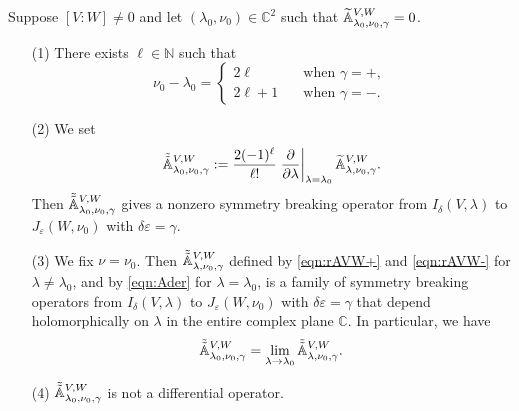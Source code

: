 \begin{theorem}
\label{thm:170340}
Suppose $[V:W]\ne 0$
 and let $({\lambda_0}, {\nu_0}) \in {\mathbb{C}}^2$
 such that ${\widetilde{\mathbb{A}}}_{{\lambda_0},{\nu_0},{\gamma}}^{{V,W}}=0$.  
\begin{enumerate}
\item[{\rm{(1)}}]
There exists $\ell \in {\mathbb{N}}$
 such that
\[
 \nu_0 - \lambda_0 =
 \begin{cases}
 2\ell \quad &\text{when $\gamma =+$, }
\\
 2\ell+1 \quad &\text{when $\gamma =-$. }
 \end{cases}
\]
\item[{\rm{(2)}}]
We set 
\begin{equation}
\label{eqn:Ader}
  \tilde{\tilde{{\mathbb{A}}}}_{{\lambda_0},{\nu_0},{\gamma}}^{{V,W}}
  :=
  \frac{2(-1)^\ell}{\ell!}
  \left. \frac{\partial}{\partial \lambda}\right|_{\lambda=\lambda_0}
  {\widetilde{\mathbb{A}}}_{{\lambda},{\nu_0},{\gamma}}^{{V,W}}.  
\end{equation}
Then $\tilde{\tilde{{\mathbb{A}}}}_{{\lambda_0},{\nu_0},{\gamma}}^{{V,W}}$
 gives a nonzero symmetry breaking operator from
 $I_{\delta}(V,\lambda)$ to $J_{\varepsilon}(W,\nu_0)$
 with $\delta \varepsilon = \gamma$.  
\item[{\rm{(3)}}]
We fix $\nu=\nu_0$.  
Then $\tilde{\tilde{{\mathbb{A}}}}_{{\lambda},{\nu_0},{\gamma}}^{{V,W}}$ defined
 by \eqref{eqn:rAVW+} and \eqref{eqn:rAVW-}
 for $\lambda \ne \lambda_0$, 
 and by \eqref{eqn:Ader} for $\lambda = \lambda_0$, 
 is a family of symmetry breaking operators from 
 $I_{\delta}(V,\lambda)$ to $J_{\varepsilon}(W,\nu_0)$
 with $\delta \varepsilon =\gamma$ 
 that depend holomorphically
 on $\lambda$ 
 in the entire complex plane ${\mathbb{C}}$.  
In particular,
 we have 
\begin{equation}
\label{eqn:rSBOlim}
\tilde{\tilde{{\mathbb{A}}}}_{{\lambda_0},{\nu_0},{\gamma}}^{{V,W}}
=
  \lim_{\lambda \to \lambda_0} \tilde{\tilde{{\mathbb{A}}}}_{{\lambda},{\nu_0},{\gamma}}^{{V,W}}.  
\end{equation}
\item[{\rm{(4)}}]
$\tilde{\tilde{{\mathbb{A}}}}_{{\lambda_0},{\nu_0},{\gamma}}^{{V,W}}$ is not a differential operator.  
\end{enumerate}
\end{theorem}


